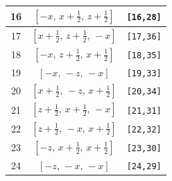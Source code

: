 \documentclass[fleqn,8pt]{jsarticle}
\begin{document}
\begin{longtable}{ccc}
16 & $\left[ - x,\, x + \frac{1}{2},\, z + \frac{1}{2} \right]$ & {\tt [16,28]} \\ \hline
17 & $\left[ x + \frac{1}{2},\, z + \frac{1}{2},\, - x \right]$ & {\tt [17,36]} \\ \hline
18 & $\left[ - x,\, z + \frac{1}{2},\, x + \frac{1}{2} \right]$ & {\tt [18,35]} \\ \hline
19 & $\left[ - x,\, - z,\, - x \right]$ & {\tt [19,33]} \\ \hline
20 & $\left[ x + \frac{1}{2},\, - z,\, x + \frac{1}{2} \right]$ & {\tt [20,34]} \\ \hline
21 & $\left[ z + \frac{1}{2},\, x + \frac{1}{2},\, - x \right]$ & {\tt [21,31]} \\ \hline
22 & $\left[ z + \frac{1}{2},\, - x,\, x + \frac{1}{2} \right]$ & {\tt [22,32]} \\ \hline
23 & $\left[ - z,\, x + \frac{1}{2},\, x + \frac{1}{2} \right]$ & {\tt [23,30]} \\ \hline
24 & $\left[ - z,\, - x,\, - x \right]$ & {\tt [24,29]} \\
\end{longtable}
\renewcommand{\arraystretch}{1.2}
\end{document}
